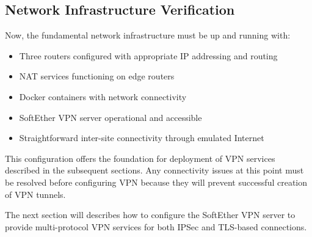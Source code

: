 \subsection{Network Infrastructure Verification}

Now, the fundamental network infrastructure must be up and running with:

\begin{itemize}
    \item Three routers configured with appropriate IP addressing and routing
    \item NAT services functioning on edge routers
    \item Docker containers with network connectivity
    \item SoftEther VPN server operational and accessible
    \item Straightforward inter-site connectivity through emulated Internet
\end{itemize}

\noindent
This configuration offers the foundation for deployment of VPN services described in the subsequent sections. Any connectivity issues at this point must be resolved before configuring VPN because they will prevent successful creation of VPN tunnels.

\noindent
The next section will describes how to configure the SoftEther VPN server to provide multi-protocol VPN services for both IPSec and TLS-based connections.
